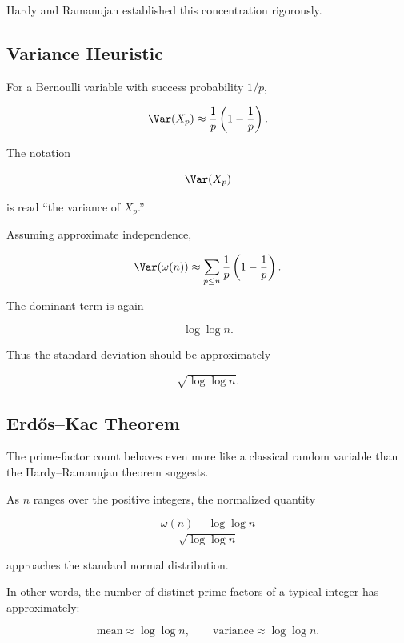 Hardy and Ramanujan established this concentration rigorously.

\subsection{Variance Heuristic}
\label{subsec:omega-variance}

For a Bernoulli variable with success probability \(1/p\),

\[ \Var(X_p)\approx\frac1p\left(1-\frac1p\right). \]

The notation

\[ \Var(X_p) \]

is read ``the variance of \(X_p\).''

Assuming approximate independence,

\[
\Var(\omega(n))
\approx
\sum_{p\leq n}
\frac1p\left(1-\frac1p\right).
\]

The dominant term is again

\[ \log\log n. \]

Thus the standard deviation should be approximately

\[ \sqrt{\log\log n}. \]

\subsection{Erdős--Kac Theorem}
\label{subsec:erdos-kac-theorem}

The prime-factor count behaves even more like a classical random variable
than the Hardy--Ramanujan theorem suggests.

\begin{theorem}
As \(n\) ranges over the positive integers, the normalized quantity

\[
\boxed{
\frac{\omega(n)-\log\log n}{\sqrt{\log\log n}}
}
\]

approaches the standard normal distribution.
\end{theorem}

In other words, the number of distinct prime factors of a typical integer
has approximately:

\[
\text{mean}\approx\log\log n,
\qquad
\text{variance}\approx\log\log n.
\]


